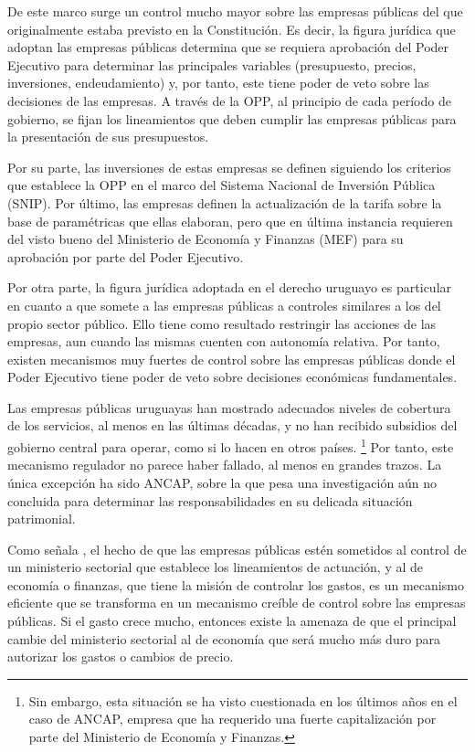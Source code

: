 \documentclass[
  12pt,
  spanish,
]{book}
\begin{document}
De este marco surge un control mucho mayor sobre las empresas públicas
del que originalmente estaba previsto en la Constitución. Es decir, la
figura jurídica que adoptan las empresas públicas determina que se
requiera aprobación del Poder Ejecutivo para determinar las principales
variables (presupuesto, precios, inversiones, endeudamiento) y, por
tanto, este tiene poder de veto sobre las decisiones de las empresas. A
través de la OPP, al principio de cada período de gobierno, se fijan los
lineamientos que deben cumplir las empresas públicas para la
presentación de sus presupuestos.

Por su parte, las inversiones de estas empresas se definen siguiendo los
criterios que establece la OPP en el marco del Sistema Nacional de
Inversión Pública (SNIP). Por último, las empresas definen la
actualización de la tarifa sobre la base de paramétricas que ellas
elaboran, pero que en última instancia requieren del visto bueno del
Ministerio de Economía y Finanzas (MEF) para su aprobación por parte del
Poder Ejecutivo.

Por otra parte, la figura jurídica adoptada en el derecho uruguayo es
particular en cuanto a que somete a las empresas públicas a controles
similares a los del propio sector público. Ello tiene como resultado
restringir las acciones de las empresas, aun cuando las mismas cuenten
con autonomía relativa. Por tanto, existen mecanismos muy fuertes de
control sobre las empresas públicas donde el Poder Ejecutivo tiene poder
de veto sobre decisiones económicas fundamentales.

Las empresas públicas uruguayas han mostrado adecuados niveles de
cobertura de los servicios, al menos en las últimas décadas, y no han
recibido subsidios del gobierno central para operar, como si lo hacen en
otros países. \footnote{Sin embargo, esta situación se ha visto
  cuestionada en los últimos años en el caso de ANCAP, empresa que ha
  requerido una fuerte capitalización por parte del Ministerio de
  Economía y Finanzas.} Por tanto, este mecanismo regulador no parece
haber fallado, al menos en grandes trazos. La única excepción ha sido
ANCAP, sobre la que pesa una investigación aún no concluida para
determinar las responsabilidades en su delicada situación patrimonial.

Como señala \citet{Tirole1994}, el hecho de que las empresas públicas
estén sometidos al control de un ministerio sectorial que establece los
lineamientos de actuación, y al de economía o finanzas, que tiene la
misión de controlar los gastos, es un mecanismo eficiente que se
transforma en un mecanismo creíble de control sobre las empresas
públicas. Si el gasto crece mucho, entonces existe la amenaza de que el
principal cambie del ministerio sectorial al de economía que será mucho
más duro para autorizar los gastos o cambios de precio.
\end{document}
